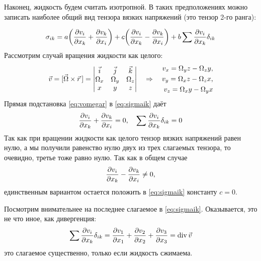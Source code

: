 Наконец, жидкость будем считать изотропной. В таких предположениях можно записать наиболее общий вид тензора вязких напряжений (это тензор 2-го ранга):
{\color{red}
\begin{equation}
	\label{eq:sigmaik}
    \sigma_{ik} = a\qty(
        \pdv{v_i}{x_k}+\pdv{v_k}{x_i}
    )+
    c\qty(
       \pdv{v_i}{x_k}-\pdv{v_k}{x_i}
    )+
    b\sum \pdv{v_i}{x_k} \delta_{ik}
\end{equation}
Рассмотрим случай вращения жидкости как целого:
\begin{equation}
	\label{eq:vomegar}
    \vec{v} = [\vec{\Omega}\times \vec{r}\,]  =
    \mqty|
    \vec{i} & \vec{j} & \vec{k}\\
    \Omega_x & \Omega_y & \Omega_z\\
    x& y & z
    | \quad \Rightarrow \quad
    \begin{aligned}
    	v_x = \Omega_y z - \Omega_z y,\\
    	v_y = \Omega_x z - \Omega_z x, \\
    	v_z = \Omega_x y - \Omega_y x
    \end{aligned}
\end{equation}
Прямая подстановка \eqref{eq:vomegar} в \eqref{eq:sigmaik} даёт
\begin{equation}
    \pdv{v_i}{x_k}+\pdv{v_k}{x_i} = 0, \quad
    \sum \pdv{v_i}{x_k} \delta_{ik} = 0
\end{equation}
Так как при вращении жидкости как 	целого тензор вязких напряжений равен нулю, а мы получили равенство нулю двух из трех слагаемых тензора, то очевидно, третье тоже равно нулю.
Так как в общем случае
\begin{equation}
    \pdv{v_i}{x_k}-\pdv{v_k}{x_i} \ne 0,
\end{equation}
единственным вариантом остается положить в \eqref{eq:sigmaik} константу $c=0$.

Посмотрим внимательнее на последнее слагаемое в \eqref{eq:sigmaik}. Оказывается, это не что иное, как дивергенция:
\begin{equation}
    \sum \pdv{v_i}{x_k} \delta_{ik} = 
    \pdv{v_1}{x_1}+\pdv{v_2}{x_2}+\pdv{v_3}{x_3} = \operatorname{div} \vec{v}
\end{equation}
это слагаемое существенно, только если жидкость сжимаема.

}

